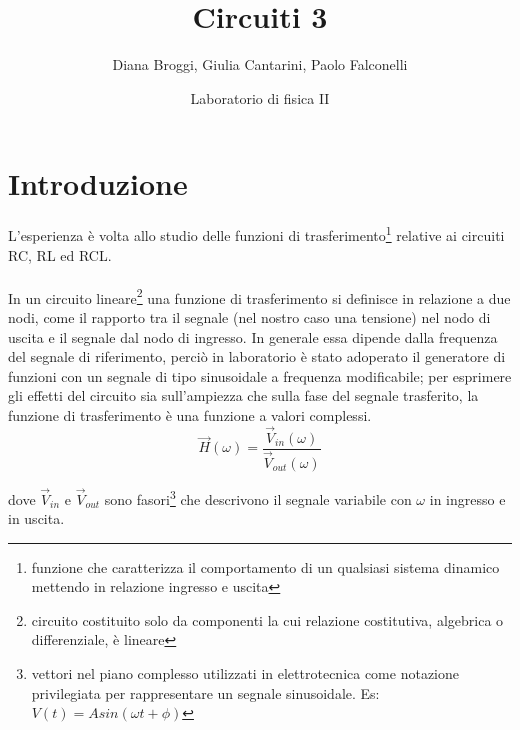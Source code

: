 \documentclass{article}
\title{Circuiti 3}
\author{Diana Broggi, Giulia Cantarini, Paolo Falconelli}
\date{Laboratorio di fisica II}
\theoremstyle{definition}
\begin{document}
\maketitle
\tableofcontents
\section{Introduzione}
L'esperienza è volta allo studio delle funzioni di trasferimento\footnote{funzione che caratterizza il comportamento di un qualsiasi sistema dinamico mettendo in relazione ingresso e uscita} relative ai circuiti RC, RL ed RCL. \\\\
In un circuito lineare\footnote{circuito costituito solo da componenti la cui relazione costitutiva, algebrica o differenziale, è lineare} una funzione di trasferimento si definisce in relazione a due nodi, come il rapporto tra il segnale (nel nostro caso una tensione) nel nodo di uscita e il segnale dal nodo di ingresso. In generale essa dipende dalla frequenza del segnale di riferimento, perciò in laboratorio è stato adoperato il generatore di funzioni con un segnale di tipo sinusoidale a frequenza modificabile; per esprimere gli effetti del circuito sia sull'ampiezza che sulla fase del segnale trasferito, la funzione di trasferimento è una funzione a valori complessi. \\
\[\vec{H}(\omega)= \frac{\vec{V}_{in}(\omega)}{\vec{V}_{out}(\omega)}\]

dove \(\vec{V}_{in}\) e \(\vec{V}_{out}\) sono fasori\footnote{vettori nel piano complesso utilizzati in elettrotecnica come notazione privilegiata per rappresentare un segnale sinusoidale. Es: \(V(t) = Asin(\omega t + \phi )\)} che descrivono il segnale variabile con \(\omega\) in ingresso e in uscita. 
\end{document}
